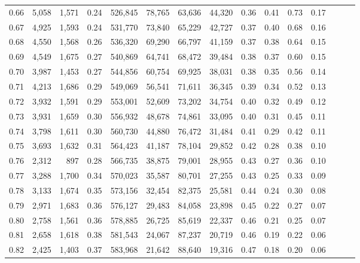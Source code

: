 \begin{tabular}{rrrrrrrrrrrrrrr}
0.66 &   5,058 &  1,571 &  0.24 &  526,845 &   78,765 &   63,636 &   44,320 &  0.36 &  0.41 &  0.73 &      0.17 \\
0.67 &   4,925 &  1,593 &  0.24 &  531,770 &   73,840 &   65,229 &   42,727 &  0.37 &  0.40 &  0.68 &      0.16 \\
0.68 &   4,550 &  1,568 &  0.26 &  536,320 &   69,290 &   66,797 &   41,159 &  0.37 &  0.38 &  0.64 &      0.15 \\
0.69 &   4,549 &  1,675 &  0.27 &  540,869 &   64,741 &   68,472 &   39,484 &  0.38 &  0.37 &  0.60 &      0.15 \\
0.70 &   3,987 &  1,453 &  0.27 &  544,856 &   60,754 &   69,925 &   38,031 &  0.38 &  0.35 &  0.56 &      0.14 \\
0.71 &   4,213 &  1,686 &  0.29 &  549,069 &   56,541 &   71,611 &   36,345 &  0.39 &  0.34 &  0.52 &      0.13 \\
0.72 &   3,932 &  1,591 &  0.29 &  553,001 &   52,609 &   73,202 &   34,754 &  0.40 &  0.32 &  0.49 &      0.12 \\
0.73 &   3,931 &  1,659 &  0.30 &  556,932 &   48,678 &   74,861 &   33,095 &  0.40 &  0.31 &  0.45 &      0.11 \\
0.74 &   3,798 &  1,611 &  0.30 &  560,730 &   44,880 &   76,472 &   31,484 &  0.41 &  0.29 &  0.42 &      0.11 \\
0.75 &   3,693 &  1,632 &  0.31 &  564,423 &   41,187 &   78,104 &   29,852 &  0.42 &  0.28 &  0.38 &      0.10 \\
0.76 &   2,312 &    897 &  0.28 &  566,735 &   38,875 &   79,001 &   28,955 &  0.43 &  0.27 &  0.36 &      0.10 \\
0.77 &   3,288 &  1,700 &  0.34 &  570,023 &   35,587 &   80,701 &   27,255 &  0.43 &  0.25 &  0.33 &      0.09 \\
0.78 &   3,133 &  1,674 &  0.35 &  573,156 &   32,454 &   82,375 &   25,581 &  0.44 &  0.24 &  0.30 &      0.08 \\
0.79 &   2,971 &  1,683 &  0.36 &  576,127 &   29,483 &   84,058 &   23,898 &  0.45 &  0.22 &  0.27 &      0.07 \\
0.80 &   2,758 &  1,561 &  0.36 &  578,885 &   26,725 &   85,619 &   22,337 &  0.46 &  0.21 &  0.25 &      0.07 \\
0.81 &   2,658 &  1,618 &  0.38 &  581,543 &   24,067 &   87,237 &   20,719 &  0.46 &  0.19 &  0.22 &      0.06 \\
0.82 &   2,425 &  1,403 &  0.37 &  583,968 &   21,642 &   88,640 &   19,316 &  0.47 &  0.18 &  0.20 &      0.06 \\

\end{tabular}
